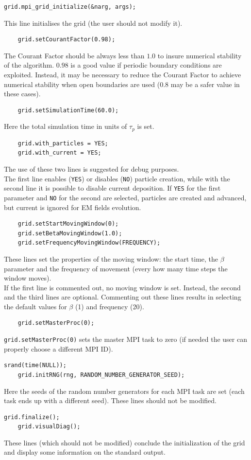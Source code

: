 \documentclass[11pt,a4paper]{report}
\begin{document}
\begin{lstlisting}[backgroundcolor=\color{no_modify}]
	grid.mpi_grid_initialize(&narg, args);
\end{lstlisting}
This line initialises the grid (the user should not modify it). 
\begin{lstlisting}
	grid.setCourantFactor(0.98);
\end{lstlisting}
The Courant Factor should be always less than $1.0$ to insure numerical stability of the algorithm. $0.98$ is a good value if periodic boundary conditions are exploited. Instead, it may be necessary to reduce the Courant Factor to achieve numerical stability when open boundaries are used ($0.8$ may be a safer value in these cases).
\begin{lstlisting}
	grid.setSimulationTime(60.0);
\end{lstlisting}
Here the total simulation time in units of $\tau_p$ is set.
\begin{lstlisting}
	grid.with_particles = YES;
	grid.with_current = YES;
\end{lstlisting}
The use of these two lines is suggested for debug purposes.\\
The first line enables (\verb+YES+) or disables (\verb+NO+) particle creation, while with the second line it is possible to disable current deposition. If \verb+YES+ for the first parameter and \verb+NO+ for the second are selected, particles are created and advanced, but current is ignored for EM fields evolution.
\begin{lstlisting}
	grid.setStartMovingWindow(0);
	grid.setBetaMovingWindow(1.0);
	grid.setFrequencyMovingWindow(FREQUENCY);
\end{lstlisting}
These lines set the properties of the moving window: the start time, the $\beta$ parameter and the frequency of movement (every how many time steps the window moves).\\
If the first line is commented out, no moving window is set. Instead, the second and the third lines are optional. Commenting out these lines results in selecting the default values for $\beta$ (1) and frequency (20).
\begin{lstlisting}
	grid.setMasterProc(0);
\end{lstlisting}
\verb+grid.setMasterProc(0)+ sets the master MPI task to zero (if needed the user can properly choose a different MPI ID). 
\begin{lstlisting}[backgroundcolor=\color{no_modify}]
	srand(time(NULL));
	grid.initRNG(rng, RANDOM_NUMBER_GENERATOR_SEED);
\end{lstlisting}
Here the seeds of the random number generators for each MPI task are set (each task ends up with a different seed). These lines should not be modified.
\begin{lstlisting}[backgroundcolor=\color{no_modify}]
	grid.finalize();
	grid.visualDiag();
\end{lstlisting}
These lines (which should not be modified) conclude the initialization of the grid and display some information on the standard output.
\end{document}
